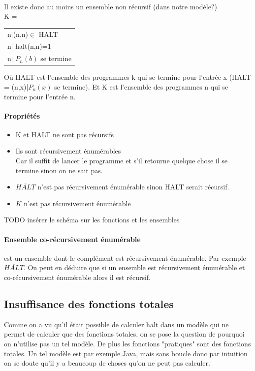 \documentclass[11pt,a4paper]{article}
\renewcommand{\stcomp}[1]{\overline{#1}}
\begin{document}
\paragraph{} Il existe donc au moins un ensemble non récursif (dans notre 
modèle?)\\
K = 
\begin{tabular}{l}
{n|(n,n)$\in$ HALT}\\
{n| halt(n,n)=1}\\
{n| $P_n(b)$ se termine} \\
\end{tabular}

Où HALT est l'ensemble des programmes k qui se termine pour l'entrée x (HALT = {(n,x)|$P_n(x)$ se 
termine}). Et K est l'ensemble des programmes n qui se termine pour l'entrée n.

\paragraph{Propriétés}

\begin{itemize}
	\item  K et HALT ne sont pas récursifs
	\item  Ils sont récursivement énumérables\\
		Car il suffit de lancer le programme et s’il retourne quelque 
		chose il se termine sinon on ne sait pas.
	\item  $\stcomp{HALT}$ n'est pas récursivement énumérable sinon HALT 
		serait récursif.
	\item $\stcomp{K}$ n'est pas récursivement énumérable
\end{itemize}

TODO insérer le schéma sur les fonctions et les ensembles

\paragraph{Ensemble co-récursivement énumérable} est un ensemble dont le 
complément est récursivement énumérable. Par exemple $\stcomp{HALT}$. On peut 
en déduire que si un ensemble est récursivement énumérable et co-récursivement 
énumérable alors il est récursif.


\subsection{Insuffisance des fonctions totales}
\label{sub:insuffisance_des_fonctions_totales}
Comme on a vu qu'il était possible de calculer halt dans un modèle qui ne 
permet de calculer que des fonctions totales, on se pose la question de 
pourquoi on n'utilise pas un tel modèle. De plus les fonctions "pratiques" sont 
des fonctions totales. Un tel modèle est par exemple Java, mais sans boucle 
donc par intuition on se doute qu'il y a beaucoup de choses qu'on ne peut pas 
calculer.
\end{document}
